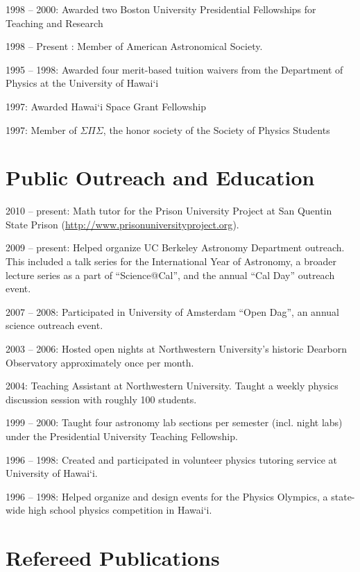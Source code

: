 \documentclass[12pt]{article}
\begin{document}
1998 -- 2000:  Awarded two Boston University Presidential Fellowships for Teaching and Research

1998 -- Present :   Member of American Astronomical Society.

1995 -- 1998:  Awarded four merit-based tuition waivers from the Department of Physics at the University of Hawai`i

1997:  Awarded Hawai`i Space Grant Fellowship

1997:  Member of $\Sigma\Pi\Sigma$, the honor society of the Society of Physics Students

\section{Public Outreach and Education}
\indent

2010 -- present:   Math tutor for the Prison University Project at San Quentin State Prison (\url{http://www.prisonuniversityproject.org}).

2009 -- present:  Helped organize UC Berkeley Astronomy Department outreach.  This included a talk series for the International Year of Astronomy, a broader lecture series as a part of ``Science@Cal'', and the annual ``Cal Day'' outreach event.

2007 -- 2008:  Participated in University of Amsterdam ``Open Dag'', an annual science outreach event.

2003 -- 2006:  Hosted open nights at Northwestern University's historic Dearborn Observatory approximately once per month.

2004:  Teaching Assistant at Northwestern University.  Taught a weekly physics discussion session with roughly 100 students.

1999 -- 2000:  Taught four astronomy lab sections per semester (incl. night labs) under the Presidential University Teaching Fellowship.

1996 -- 1998:  Created and participated in volunteer physics tutoring service at University of Hawai`i.

1996 -- 1998:  Helped organize and design events for the Physics Olympics, a state-wide high school physics competition in Hawai`i.

\section{Refereed Publications}
\end{document}
